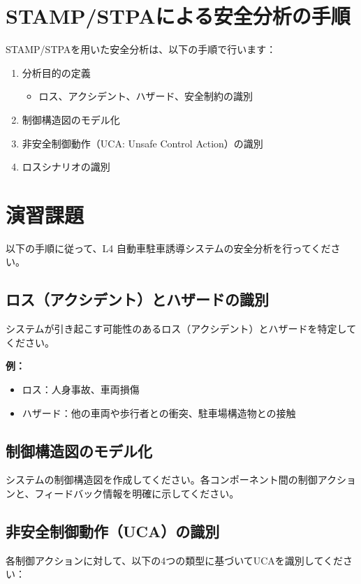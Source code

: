 \section{STAMP/STPAによる安全分析の手順}

STAMP/STPAを用いた安全分析は、以下の手順で行います：

\begin{enumerate}
    \item 分析目的の定義
    \begin{itemize}
        \item ロス、アクシデント、ハザード、安全制約の識別
    \end{itemize}
    \item 制御構造図のモデル化
    \item 非安全制御動作（UCA: Unsafe Control Action）の識別
    \item ロスシナリオの識別
\end{enumerate}

\section{演習課題}

以下の手順に従って、L4 自動車駐車誘導システムの安全分析を行ってください。

\subsection{ロス（アクシデント）とハザードの識別}
システムが引き起こす可能性のあるロス（アクシデント）とハザードを特定してください。

\textbf{例：}
\begin{itemize}
    \item ロス：人身事故、車両損傷
    \item ハザード：他の車両や歩行者との衝突、駐車場構造物との接触
\end{itemize}

\subsection{制御構造図のモデル化}
システムの制御構造図を作成してください。各コンポーネント間の制御アクションと、フィードバック情報を明確に示してください。

\subsection{非安全制御動作（UCA）の識別}
各制御アクションに対して、以下の4つの類型に基づいてUCAを識別してください：

